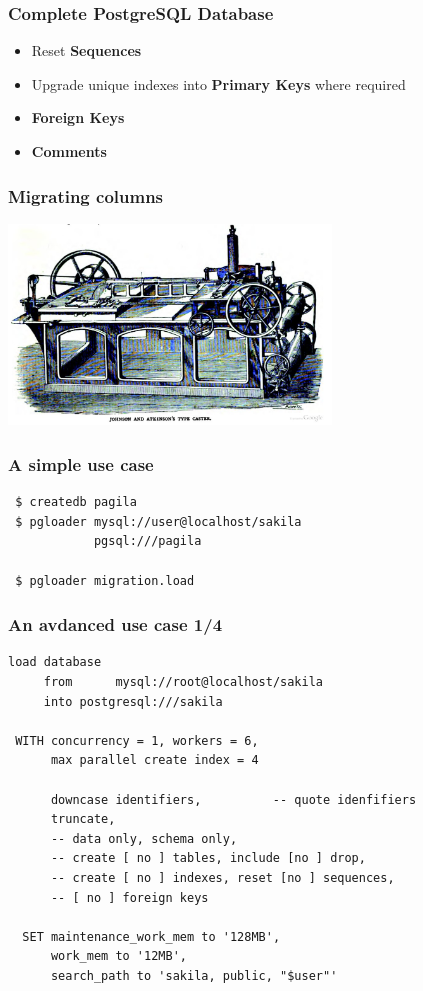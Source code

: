 \documentclass{beamer}
\begin{document}
\begin{frame}
  \frametitle{Complete PostgreSQL Database}

  \vfill

  \begin{itemize}
  \item Reset \textbf{Sequences}
  \item Upgrade unique indexes into \textbf{Primary Keys} where required
  \item \textbf{Foreign Keys}
  \item \textbf{Comments}
  \end{itemize}
\end{frame}

\begin{frame}
  \frametitle{Migrating columns}

  
  \begin{center}
    \includegraphics[height=2.1in]{type-casting-machine.jpg}
  \end{center}
\end{frame}

\begin{frame}[fragile]
  \frametitle{A simple use case}

  \vfill

\begin{verbatim}
 $ createdb pagila
 $ pgloader mysql://user@localhost/sakila
            pgsql:///pagila

 $ pgloader migration.load
\end{verbatim}
\end{frame}

\begin{frame}[fragile]
  \frametitle{An avdanced use case 1/4}

\begin{verbatim}
load database
     from      mysql://root@localhost/sakila
     into postgresql:///sakila

 WITH concurrency = 1, workers = 6,
      max parallel create index = 4

      downcase identifiers,          -- quote idenfifiers
      truncate,
      -- data only, schema only,
      -- create [ no ] tables, include [no ] drop,
      -- create [ no ] indexes, reset [no ] sequences,
      -- [ no ] foreign keys

  SET maintenance_work_mem to '128MB',
      work_mem to '12MB',
      search_path to 'sakila, public, "$user"'
\end{verbatim}
\end{frame}
\end{document}
